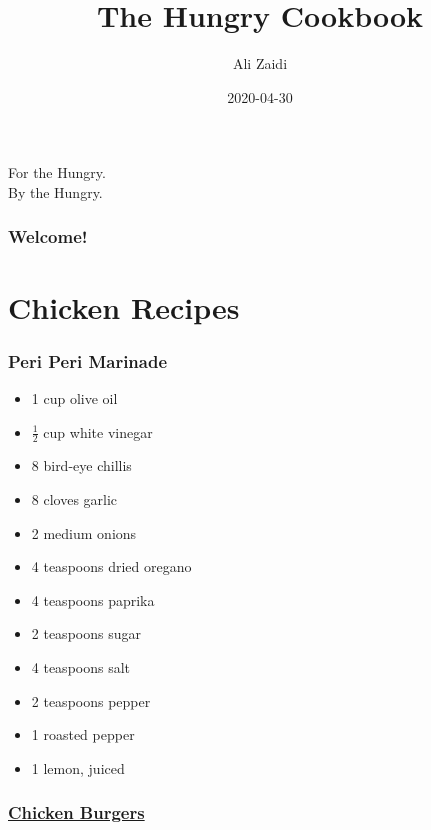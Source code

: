 \documentclass[
]{article}
\title{The Hungry Cookbook}
\author{Ali Zaidi}
\date{2020-04-30}
\providecommand{\tightlist}{%
  \setlength{\itemsep}{0pt}\setlength{\parskip}{0pt}}
\begin{document}
\maketitle


\begin{center}
For the Hungry. \\
By the Hungry.

\end{center}


{
\setcounter{tocdepth}{2}
\tableofcontents
}
\hypertarget{welcome}{%
\section*{Welcome!}\label{welcome}}

\hypertarget{part-chicken-recipes}{%
\part{Chicken Recipes}\label{part-chicken-recipes}}

\hypertarget{peri-peri-marinade}{%
\section{Peri Peri Marinade}\label{peri-peri-marinade}}

\begin{itemize}
\tightlist
\item
  1 cup olive oil
\item
  \(\frac{1}{2}\) cup white vinegar
\item
  8 bird-eye chillis
\item
  8 cloves garlic
\item
  2 medium onions
\item
  4 teaspoons dried oregano
\item
  4 teaspoons paprika
\item
  2 teaspoons sugar
\item
  4 teaspoons salt
\item
  2 teaspoons pepper
\item
  1 roasted pepper
\item
  1 lemon, juiced
\end{itemize}

\hypertarget{chicken-burgers}{%
\section{\texorpdfstring{\href{https://www.foodnetwork.com/recipes/rachael-ray/bbq-chicken-burgers-with-slaw-recipe-1917239}{Chicken Burgers}}{Chicken Burgers}}\label{chicken-burgers}}
\end{document}
